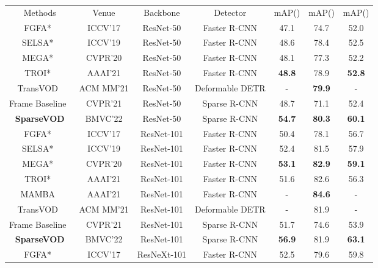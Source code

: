 \documentclass{bmvc2k}
\begin{document}
\begin{table}
\begin{center}
\scriptsize
\begin{tabular}{ccccccc}
\toprule
Methods & Venue & Backbone & Detector & mAP() & mAP()  &  mAP()\\
\noalign{\smallskip}
\hline
FGFA*~\cite{zhu2017flow}  & ICCV'17 & ResNet-50 & Faster R-CNN & 47.1 & 74.7 & 52.0 \\
SELSA*~\cite{wu2019sequence}  & ICCV'19 & ResNet-50 & Faster R-CNN & 48.6 & 78.4 & 52.5 \\
MEGA*~\cite{chen2020memory}  & CVPR'20 & ResNet-50 & Faster R-CNN & 48.1 & 77.3 & 52.2 \\
TROI*~\cite{gong2021temporal}  & AAAI'21 & ResNet-50 & Faster R-CNN & \textbf{\color{blue} 48.8}  & 78.9 & \textbf{\color{blue}52.8} \\
TransVOD~\cite{he2021end}  & ACM MM'21 & ResNet-50 & Deformable DETR& -  & \textbf{\color{blue}79.9} & - \\
\hline
{Frame Baseline~\cite{sun2021sparse}}& CVPR'21 & ResNet-50 & Sparse R-CNN &48.7 & 71.1 & 52.4 \\
{\textbf{SparseVOD} }& BMVC'22 & ResNet-50 & Sparse R-CNN & \textbf{\color{red}54.7} & \textbf{\color{red}80.3} & \textbf{\color{red}60.1} \\
\hline
FGFA*~\cite{zhu2017flow}  & ICCV'17 & ResNet-101 & Faster R-CNN & 50.4 & 78.1 & 56.7 \\
SELSA*~\cite{wu2019sequence}  & ICCV'19 & ResNet-101 & Faster R-CNN & 52.4 & 81.5 &  57.9 \\
MEGA*~\cite{chen2020memory}  & CVPR'20 & ResNet-101 & Faster R-CNN & \textbf{\color{blue}53.1}  & \textbf{\color{blue} 82.9} & \textbf{\color{blue}59.1}\\
TROI*~\cite{gong2021temporal}  & AAAI'21 & ResNet-101 & Faster R-CNN& 51.6  &   82.6 & 56.3 \\
MAMBA~\cite{sun2021mamba}  & AAAI'21 & ResNet-101 & Faster R-CNN& -  &  \textbf{\color{red} 84.6} & - \\
TransVOD~\cite{he2021end}  & ACM MM'21 & ResNet-101 & Deformable DETR & - &81.9 & - \\
\hline
{Frame Baseline~\cite{sun2021sparse}}& CVPR'21 & ResNet-101 & Sparse R-CNN & 51.7 & 74.6 & 53.9 \\
{\textbf{SparseVOD} }& BMVC'22 & ResNet-101 & Sparse R-CNN  & \textbf{\color{red}56.9} & 81.9 & \textbf{\color{red}63.1}\\
\hline
FGFA*~\cite{zhu2017flow}  & ICCV'17 & ResNeXt-101 & Faster R-CNN& 52.5  & 79.6 & 59.8 \\

\end{tabular}
\end{center}
\end{table}
\end{document}
